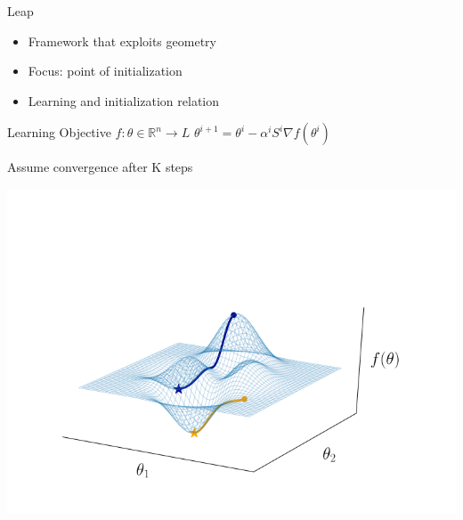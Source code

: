 \documentclass[aspectratio=169]{beamer}
\begin{document}
\begin{frame}{Leap}
	\begin{minipage}{0.45\textwidth}
		\begin{itemize}
			\item Framework that exploits geometry
			\item \color{Pink}Focus: \color{Black}point of initialization
			\item Learning and initialization relation
		\end{itemize}
		\begin{block}{\color{White}Learning Objective $f:\theta\in\mathbb{R}^n \to L  $}	
			$\theta^{i+1} = \theta^i -\alpha^i S^i\nabla f(\theta^i)$
		\end{block}
		\color{Pink}Assume convergence after K steps	
	\end{minipage}%
	\hspace{0.5cm}
	\begin{minipage}{0.5\textwidth}
		\includegraphics[width=\textwidth]{Figures/loss}
	\end{minipage}
\end{frame}
\end{document}
